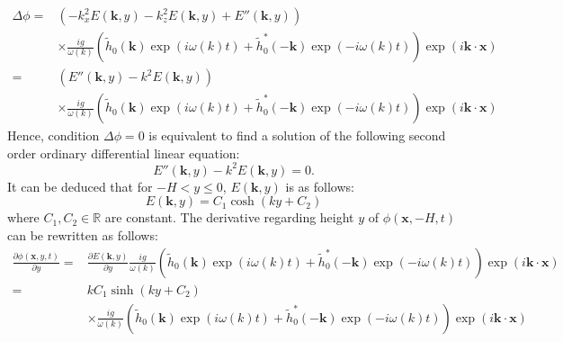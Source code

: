 \documentclass[final]{jcgt}
\begin{document}
\begin{align}
	\Delta \phi\nonumber= & \left(-k_x^2 E(\mathbf{k},y) -k_z^2E(\mathbf{k},y) + E''(\mathbf{k},y)\right)\nonumber                                                                                      \\
	                      & \times \frac{ig}{\omega(k)}\left(\tilde{h}_0(\mathbf{k})\exp(i\omega(k)t)+\tilde{h}_0^*(-\mathbf{k})\exp(-i\omega(k)t)\right)
	\exp\left( i \mathbf{k}\cdot \mathbf{x}\right)\nonumber                                                                                                                                             \\
	=                     & \left(E''(\mathbf{k},y)-k^2E(\mathbf{k},y)\right) \nonumber                                                                                                                 \\
	                      & \times \frac{ig}{\omega(k)}\left(\tilde{h}_0(\mathbf{k})\exp(i\omega(k)t)+\tilde{h}_0^*(-\mathbf{k})\exp(-i\omega(k)t)\right) \exp\left(i \mathbf{k}\cdot \mathbf{x}\right)
\end{align}
Hence, condition $\Delta \phi=0$ is equivalent to find a solution of the following second order ordinary differential linear equation:
\begin{equation}
	E''(\mathbf{k}, y)-k^2E(\mathbf{k}, y) = 0.
\end{equation}
It can be deduced that for $-H<y\leq 0$, $E(\mathbf{k}, y)$ is as follows:
\begin{equation}
	E(\mathbf{k}, y)=C_1\cosh(ky+C_2)
\end{equation}
where $C_1,C_2\in\mathbb{R}$ are constant.
The derivative regarding height $y$ of $\phi(\mathbf{x},-H,t)$ can be rewritten as follows:
\begin{align*}
	\frac{\partial\phi(\mathbf{x},y,t)}{\partial y}= &
	\frac{\partial E(\mathbf{k},y)}{\partial y}\frac{ig}{\omega(k)}\left(\tilde{h}_0(\mathbf{k})\exp(i\omega(k)t)+\tilde{h}_0^*(-\mathbf{k})\exp(-i\omega(k)t)\right)\exp\left(i\mathbf{k}\cdot\mathbf x\right)               \\
	=                                                & kC_1\sinh(ky+C_2)                                                                                                                                                      \\
	                                                 & \times\frac{ig}{\omega(k)}\left(\tilde{h}_0(\mathbf{k})\exp(i\omega(k)t)+\tilde{h}_0^*(-\mathbf{k})\exp(-i\omega(k)t)\right)\exp\left(i\mathbf{k}\cdot\mathbf x\right)
\end{align*}
\end{document}
